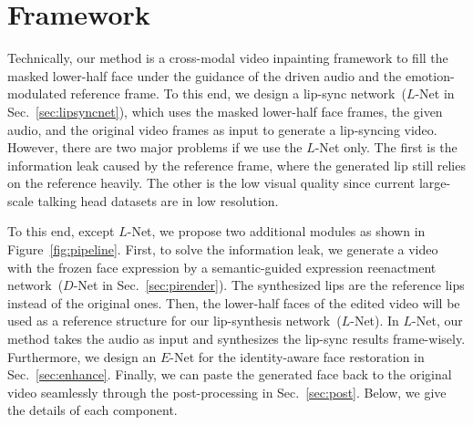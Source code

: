 \section{Framework}
Technically, our method is a cross-modal video inpainting framework to fill the masked lower-half face under the guidance of the driven audio and the emotion-modulated reference frame. 
To this end, we design a lip-sync network~($L$-Net in Sec.~\ref{sec:lipsyncnet}), which uses the masked lower-half face frames, the given audio, and the original video frames as input to generate a lip-syncing video. 
However, there are two major problems if we use the $L$-Net only. The first is the information leak caused by the reference frame, where the generated lip still relies on the reference heavily. The other is the low visual quality since current large-scale talking head datasets are in low resolution.

To this end, except $L$-Net, we propose two additional modules as shown in Figure~\ref{fig:pipeline}. 
First, to solve the information leak, we generate a video with the frozen face expression by a semantic-guided expression reenactment network~(${D}$-Net in Sec.~\ref{sec:pirender}). 
The synthesized lips are the reference lips instead of the original ones. 
Then, the lower-half faces of the edited video will be used as a reference structure for our lip-synthesis network~(${L}$-Net). In ${L}$-Net, our method takes the audio as input and synthesizes the lip-sync results frame-wisely. Furthermore, we design an ${E}$-Net for the identity-aware face restoration in Sec.~\ref{sec:enhance}. Finally, we can paste the generated face back to the original video seamlessly through the post-processing in Sec.~\ref{sec:post}. Below, we give the details of each component.




